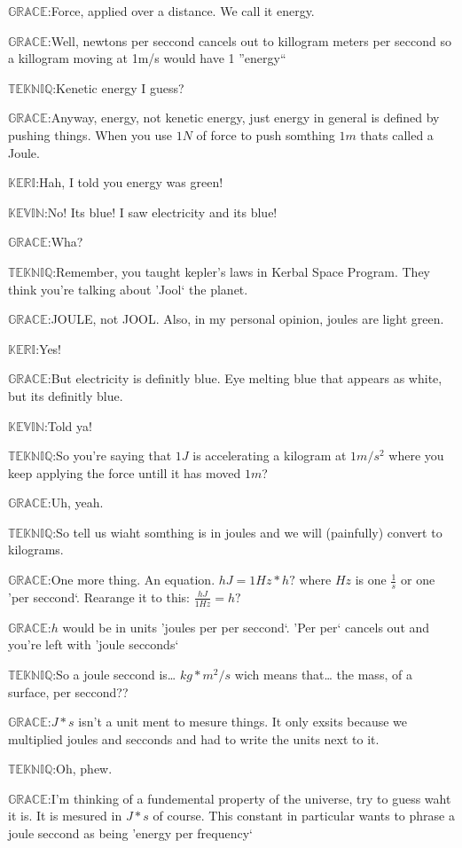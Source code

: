 \documentclass{article}
\newcommand{\gr}{\noindent$\mathbb{GRACE}$:}
\newcommand{\tek}{\noindent$\mathbb{TEKNIQ}$:}
\newcommand{\kev}{\noindent$\mathbb{KEVIN}$:}
\newcommand{\kem}{\noindent$\mathbb{KERI}$:}
\begin{document}
\gr Force, applied over a distance. We call it energy.

\gr Well, newtons per seccond cancels out to killogram meters per seccond so a killogram moving at 1m/s would have 1 ''energy``

\tek Kenetic energy I guess?

\gr Anyway, energy, not kenetic energy, just energy in general is defined by pushing things. When you use $1N$ of force to push somthing $1m$ thats called a Joule.

\kem Hah, I told you energy was green!

\kev No! Its blue! I saw electricity and its blue!

\gr Wha?

\tek Remember, you taught kepler's laws in Kerbal Space Program. They think you're talking about 'Jool` the planet. 

\gr JOULE, not JOOL. Also, in my personal opinion, joules are light green.

\kem Yes!

\gr But electricity is definitly blue. Eye melting blue that appears as white, but its definitly blue.

\kev Told ya!

\tek So you're saying that $1J$ is accelerating a kilogram at $1m/s^2$ where you keep applying the force untill it has moved $1m$?

\gr Uh, yeah.

\tek So tell us wiaht somthing is in joules and we will (painfully) convert to kilograms.

\gr One more thing. An equation. $h J=1 Hz*h ?$ where $Hz$ is one $\frac{1}{s}$ or one 'per seccond`. Rearange it to this: $\frac{h J}{1 Hz} = h ?$

\gr $h$ would be in units 'joules per per seccond`. 'Per per` cancels out and you're left with 'joule secconds`

\tek So a joule seccond is\ldots{} $kg*m^2/s$ wich means that\ldots{} the mass, of a surface, per seccond??

\gr $J*s$ isn't a unit ment to mesure things. It only exsits because we multiplied joules and secconds and had to write the units next to it.

\tek Oh, phew.

\gr I'm thinking of a fundemental property of the universe, try to guess waht it is. It is mesured in $J*s$ of course. This constant in particular wants to phrase a joule seccond as being 'energy per frequency`
\end{document}
